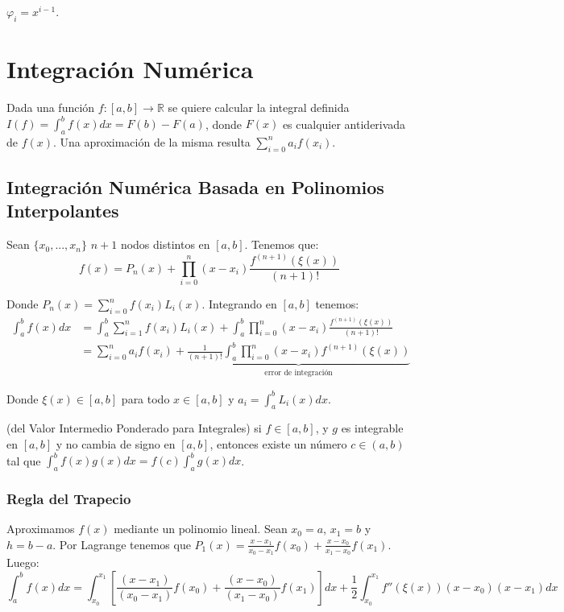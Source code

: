 \(\varphi_i = x^{i-1}\).

\hypertarget{integraciuxf3n-numuxe9rica}{%
\section{Integración Numérica}\label{integraciuxf3n-numuxe9rica}}

Dada una función \(f : [a,b] \rightarrow \ensuremath{\mathbb{R}}\) se
quiere calcular la integral definida
\(I(f) = \int_a^b f(x) dx = F(b) - F(a)\), donde \(F(x)\) es cualquier
antiderivada de \(f(x)\). Una aproximación de la misma resulta
\(\sum_{i=0}^n a_i f(x_i)\).

\hypertarget{integraciuxf3n-numuxe9rica-basada-en-polinomios-interpolantes}{%
\subsection{Integración Numérica Basada en Polinomios
Interpolantes}\label{integraciuxf3n-numuxe9rica-basada-en-polinomios-interpolantes}}

Sean \(\{x_0, ..., x_n\}\) \(n+1\) nodos distintos en \([a,b]\). Tenemos
que: \[
f(x) = P_n(x) + \prod_{i=0}^n (x-x_i) \frac{f^{(n+1)}(\xi(x))}{(n+1)!}
\]

Donde \(P_n(x) = \sum_{i=0}^n f(x_i) L_i(x)\). Integrando en \([a,b]\)
tenemos: \begin{align*}
\int_a^b f(x) dx &= \int_a^b \sum_{i=1}^n f(x_i) L_i(x) 
+ \int_a^b \prod_{i=0}^n (x-x_i) \frac{f^{(n+1)}(\xi(x))}{(n+1)!} \\
&= \sum_{i=0}^n a_i f(x_i) 
+ \underbrace{\frac{1}{(n+1)!} 
\int_a^b \prod_{i=0}^n (x-x_i) f^{(n+1)}(\xi(x))}_{\text{error de integración}}
\end{align*}

Donde \(\xi(x) \in [a,b]\) para todo \(x \in [a,b]\) y
\(a_i = \int_a^b L_i(x) dx\).

\Teorema (del Valor Intermedio Ponderado para Integrales) si
\(f \in [a,b]\), y \(g\) es integrable en \([a,b]\) y no cambia de signo
en \([a,b]\), entonces existe un número \(c \in (a,b)\) tal que
\(\int_a^b f(x)g(x) dx = f(c) \int_a^b g(x) dx\).

\hypertarget{regla-del-trapecio}{%
\subsubsection{Regla del Trapecio}\label{regla-del-trapecio}}

Aproximamos \(f(x)\) mediante un polinomio lineal. Sean \(x_0 = a\),
\(x_1 = b\) y \(h = b-a\). Por Lagrange tenemos que
\(P_1(x) = \frac{x-x_1}{x_0 - x_1} f(x_0) + \frac{x-x_0}{x_1 - x_0} f(x_1)\).
Luego: \[
\int_a^b f(x) dx = \int_{x_0}^{x_1} 
\left[ \frac{(x - x_1)}{(x_0 - x_1)} f(x_0) + \frac{(x - x_0)}{(x_1 - x_0)} f(x_1)
\right] dx 
+ \frac{1}{2} \int_{x_0}^{x_1} f''(\xi(x)) (x-x_0)(x-x_1) dx
\]

